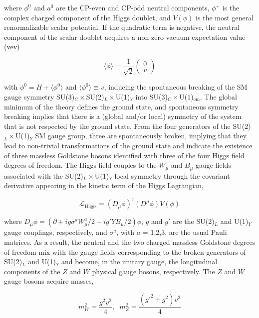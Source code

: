 \documentclass[12pt]{article}
\begin{document}
where $\phi^0$ and $a^0$ are the CP-even and CP-odd neutral components, $\phi^+$ is the complex charged component of the Higgs doublet, and $V(\phi)$ is the most general renormalizable scalar potential. If the quadratic term is negative, the neutral component of the scalar doublet acquires a non-zero vacuum expectation value (vev)

\begin{equation}
    \langle\phi\rangle = \frac{1}{\sqrt{2}}
    \begin{pmatrix}
        0 \\ v
    \end{pmatrix}
\end{equation}

with $\phi^0 = H+\langle\phi^0\rangle$ and $\langle\phi^0\rangle \equiv v$, inducing the spontaneous breaking of the SM gauge symmetry SU(3)$_C\times$SU(2)$_L\times$U(1)$_Y$ into SU(3)$_C\times$U(1)$_\text{em}$. The global minimum of the theory defines the ground state, and spontaneous symmetry breaking implies that there is a (global and/or local) symmetry of the system that is not respected by the ground state. From the four generators of the SU(2)$_L\times$U(1)$_Y$ SM gauge group, three are spontaneously broken, implying that they lead to non-trivial transformations of the ground state and indicate the existence of three massless Goldstone bosons identified with three of the four Higgs field degrees of freedom. The Higgs field couples to the $W_\mu$ and $B_\mu$ gauge fields associated with the SU(2)$_L\times$U(1)$_Y$ local symmetry through the covariant derivative appearing in the kinetic term of the Higgs Lagrangian,

\begin{equation}
    \mathcal{L}_\text{Higgs} = (D_\mu\phi)^\dagger(D^\mu\phi) V(\phi)
\end{equation}

where $D_\mu\phi=(\partial + ig\sigma^aW^a_\mu/2 + ig'YB_\mu/2)\phi$, $g$ and $g'$ are the SU(2)$_L$ and U(1)$_Y$ gauge couplings, respectively, and $\sigma^a$, with $a$ = 1,2,3, are the usual Pauli matrices. As a result, the neutral and the two charged massless Goldstone degrees of freedom mix with the gauge fields corresponding to the broken generators of SU(2)$_L$ and U(1)$_Y$ and become, in the unitary gauge, the longitudinal components of the $Z$ and $W$ physical gauge bosons, respectively. The $Z$ and $W$ gauge bosons acquire masses,

\begin{equation}
    m_W^2 = \frac{g^2v^2}{4}, \hspace{7pt} m_Z^2 = \frac{(g'^2+g^2)v^2}{4}
\end{equation}
\end{document}
